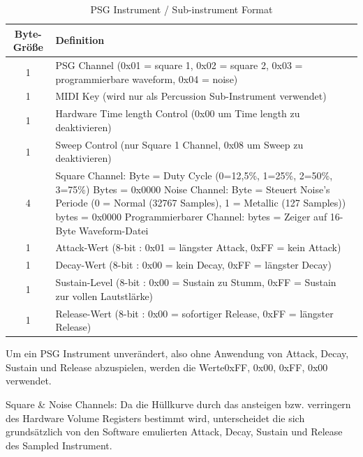 \documentclass[11pt,a4paper]{scrartcl}
\begin{document}
\begin{table}[h]
    \centering
    \begin{tabular}{ c | p{15cm} }
        \textbf{Byte-Gr\"{o}{\ss}e} & \textbf{Definition} \\
				\hline
				1 & PSG Channel (0x01 = square 1, 0x02 = square 2, 0x03 = programmierbare waveform, 0x04 = noise) \\
				\hline
        1 & MIDI Key (wird nur als Percussion Sub-Instrument verwendet)\\
				\hline
        1 & Hardware Time length Control (0x00 um Time length zu deaktivieren)\\
				\hline
        1 & Sweep Control (nur Square 1 Channel, 0x08 um Sweep zu deaktivieren) \\
				\hline
        4 & Square Channel:\newline
					1 Byte = Duty Cycle (0=12,5\%, 1=25\%, 2=50\%, 3=75\%)\newline
					3 Bytes = 0x0000\newline		
					Noise Channel:\newline	
					1 Byte = Steuert Noise's Periode (0 = Normal (32767 Samples), 1 = Metallic (127 Samples)) \newline
					3 bytes = 0x0000
					\newline
					Programmierbarer Channel:\newline
                4 bytes = Zeiger auf 16-Byte Waveform-Datei \\
				\hline
        1 & Attack-Wert (8-bit : 0x01 = l\"{a}ngster Attack, 0xFF = kein Attack)\\
				\hline
        1 & Decay-Wert (8-bit : 0x00 = kein Decay, 0xFF = l\"{a}ngster Decay) \\
				\hline
        1 & Sustain-Level (8-bit : 0x00 = Sustain zu Stumm, 0xFF = Sustain zur vollen Lautstl\"{a}rke) \\
				\hline
        1 & Release-Wert (8-bit : 0x00 = sofortiger Release, 0xFF = l\"{a}ngster Release) \\
				
    \end{tabular}
    \caption{PSG Instrument / Sub-instrument Format}
    \label{table:PSGInstrument}
\end{table}

Um ein PSG Instrument unver\"{a}ndert, also ohne Anwendung von Attack, Decay, Sustain und Release abzuspielen, werden die Werte0xFF, 0x00, 0xFF, 0x00 verwendet.

Square \& Noise Channels:\newline
Da die H\"{u}llkurve durch das ansteigen bzw. verringern des Hardware Volume Registers bestimmt wird, unterscheidet die sich grunds\"{a}tzlich von den  Software emulierten Attack, Decay, Sustain und Release des Sampled Instrument.
\end{document}
